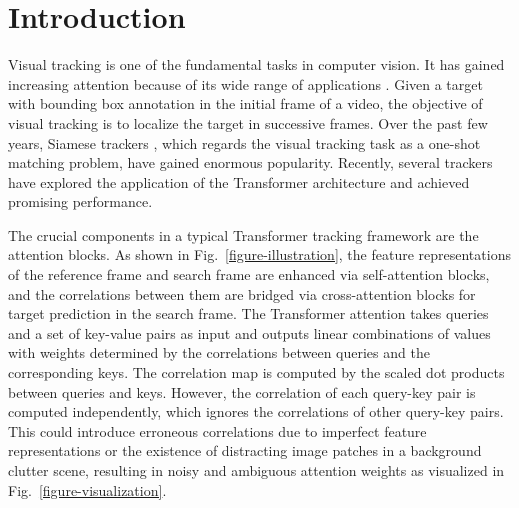 \documentclass[runningheads]{llncs}
\begin{document}
\section{Introduction}
Visual tracking is one of the fundamental tasks in computer vision. It has gained increasing attention because of its wide range of applications \cite{marvasti2021deep,fiaz2019handcrafted}. Given a target with bounding box annotation in the initial frame of a video, the objective of visual tracking is to localize the target in successive frames. Over the past few years, Siamese trackers \cite{bertinetto2016fully,li2018high,li2019siamrpn++,zhang2020ocean}, which regards the visual tracking task as a one-shot matching problem, have gained enormous popularity. Recently, several trackers \cite{wang2021transformer,chen2021transformer,yu2021high,cao2021hift,yan2021learning,xing2022siamese} have explored the application of the Transformer \cite{vaswani2017attention} architecture and achieved promising performance.

The crucial components in a typical Transformer tracking framework \cite{wang2021transformer,chen2021transformer,yu2021high} are the attention blocks. As shown in Fig.~\ref{figure-illustration}, the feature representations of the reference frame and search frame are enhanced via self-attention blocks, and the correlations between them are bridged via cross-attention blocks for target prediction in the search frame. The Transformer attention \cite{vaswani2017attention} takes queries and a set of key-value pairs as input and outputs linear combinations of values with weights determined by the correlations between queries and the corresponding keys. The correlation map is computed by the scaled dot products between queries and keys. However, the correlation of each query-key pair is computed independently, which ignores the correlations of other query-key pairs. This could introduce erroneous correlations due to imperfect feature representations or the existence of distracting image patches in a background clutter scene, resulting in noisy and ambiguous attention weights as visualized in Fig.~\ref{figure-visualization}.
\end{document}
